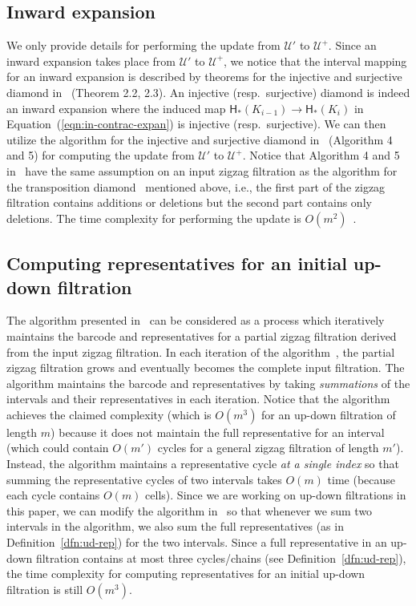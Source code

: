 \documentclass[letterpaper,11pt]{article}
\theoremstyle{mythmstyle}
\theoremstyle{mydefstyle}
\theoremstyle{plain}
\theoremstyle{definition}
\newcommand{\Hm}{\mathsf{H}}
\newcommand{\<}[1]{\langle #1\rangle}
\newcommand{\Ucal}{\mathcal{U}}
\newcommand{\filtcnt}{m}
\begin{document}
\subsection{Inward expansion}
We only provide details for performing the update from
$\Ucal'$ to $\Ucal^+$.
Since an inward expansion takes place from $\Ucal'$ to $\Ucal^+$,
we notice that the interval mapping for an inward expansion is described
by theorems for the {injective} and {surjective diamond}
in~\cite{maria2014zigzag} (Theorem 2.2, 2.3).
An injective (resp.\ surjective) diamond is indeed an inward expansion
where the induced map $\Hm_*(K_{i-1})\to\Hm_*(K_i)$ in Equation~(\ref{eqn:in-contrac-expan})
is injective (resp.\ surjective).
We can then utilize the algorithm
for the {injective} and {surjective diamond}
in~\cite{maria2014zigzag}
(Algorithm 4 and 5) for computing the 
update from
$\Ucal'$ to $\Ucal^+$.
Notice that 
Algorithm 4 and 5 in~\cite{maria2014zigzag} have the same assumption
on an input zigzag filtration 
as the algorithm for the transposition diamond~\cite{maria2014zigzag}
mentioned above,
i.e.,
the first part of the zigzag filtration contains
additions or deletions
but the second part contains only deletions.
The time complexity for performing the update is $O(\filtcnt^2)$~\cite{maria2014zigzag}.

\subsection{Computing representatives for an initial up-down filtration}
The algorithm presented in~\cite{maria2014zigzag} 
can be considered as a process which iteratively 
maintains the barcode and representatives for a partial zigzag filtration 
derived from the input zigzag filtration.
In each iteration of the algorithm~\cite{maria2014zigzag},
the partial zigzag filtration grows and
eventually becomes the complete 
input filtration.
The algorithm maintains the barcode and representatives
by taking \emph{summations} of the intervals and their
representatives
in each iteration.
Notice that the algorithm achieves  
the claimed complexity (which is $O(\filtcnt^3)$
for an up-down filtration of length $\filtcnt$)
because it does not maintain the full representative
for an interval 
(which could contain $O(m')$ cycles for a general zigzag filtration
of length $m'$).
Instead, the algorithm maintains a representative cycle
\emph{at a single index} so that summing the representative cycles
of two intervals takes $O(m)$ time (because each cycle
contains $O(m)$ cells).
Since we are working on up-down filtrations in this paper,
we can modify the algorithm in~\cite{maria2014zigzag}
so  that whenever we sum two intervals in the algorithm,
we also sum the full representatives
(as in Definition~\ref{dfn:ud-rep}) for the two intervals.
Since a full representative in an up-down filtration
contains at most three cycles/chains
(see Definition~\ref{dfn:ud-rep}), 
the time complexity for computing 
representatives for an initial up-down filtration
is still $O(m^3)$.
\end{document}

